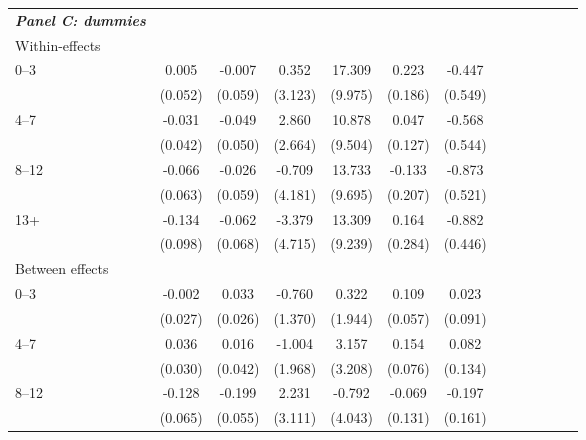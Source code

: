 \documentclass[10pt,letterpaper]{article}
\begin{document}
\begin{table}[!ht]
\begin{center}
\begin{adjustbox}{max width=\linewidth}
\begin{threeparttable}
{\begin{tabular}{l*{6}{S S}}
						\textit{\textbf{Panel C: dummies}} &&&&&&\\
						Within-effects&                  &                  &                  &                  &                  &                  \\
						0--3&    0.005         &   -0.007         &    0.352         &   17.309\sym{*}  &    0.223         &   -0.447         \\
						&  (0.052)         &  (0.059)         &  (3.123)         &  (9.975)         &  (0.186)         &  (0.549)         \\
						4--7&    -0.031         &   -0.049         &    2.860         &   10.878         &    0.047         &   -0.568         \\
						&  (0.042)         &  (0.050)         &  (2.664)         &  (9.504)         &  (0.127)         &  (0.544)         \\
						8--12&    -0.066         &   -0.026         &   -0.709         &   13.733         &   -0.133         &   -0.873\sym{*}  \\
						&  (0.063)         &  (0.059)         &  (4.181)         &  (9.695)         &  (0.207)         &  (0.521)         \\
						13+&   -0.134         &   -0.062         &   -3.379         &   13.309         &    0.164         &   -0.882\sym{**} \\
						&  (0.098)         &  (0.068)         &  (4.715)         &  (9.239)         &  (0.284)         &  (0.446)         \\
						Between effects&                  &                  &                  &                  &                  &                  \\
						0--3&      -0.002         &    0.033         &   -0.760         &    0.322         &    0.109\sym{*}  &    0.023         \\
						&  (0.027)         &  (0.026)         &  (1.370)         &  (1.944)         &  (0.057)         &  (0.091)         \\
						4--7&    0.036         &    0.016         &   -1.004         &    3.157         &    0.154\sym{**} &    0.082         \\
						&  (0.030)         &  (0.042)         &  (1.968)         &  (3.208)         &  (0.076)         &  (0.134)         \\
						8--12&  -0.128\sym{**} &   -0.199\sym{***}&    2.231         &   -0.792         &   -0.069         &   -0.197         \\
						&  (0.065)         &  (0.055)         &  (3.111)         &  (4.043)         &  (0.131)         &  (0.161)         \\

\end{tabular}}
\end{threeparttable}
\end{adjustbox}
\end{center}
\end{table}
\end{document}
